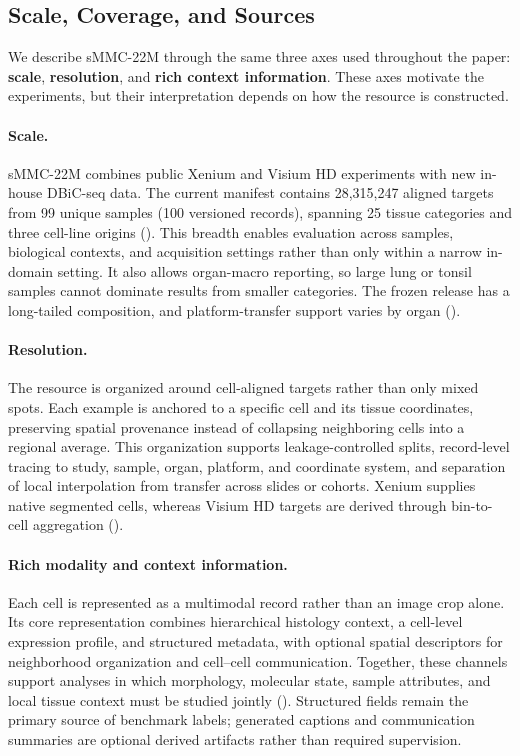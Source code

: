 \documentclass[sigconf,review]{acmart}
\newcommand{\dataset}{sMMC-22M\xspace}
\begin{document}
\subsection{Scale, Coverage, and Sources}
We describe \dataset through the same three axes used throughout the paper:
\textbf{scale}, \textbf{resolution}, and \textbf{rich context information}.
These axes motivate the experiments, but their interpretation depends on how
the resource is constructed.

\paragraph{Scale.}
\dataset combines public Xenium and Visium HD experiments with new in-house
DBiC-seq data. The current manifest contains 28{,}315{,}247 aligned targets
from 99 unique samples (100 versioned records), spanning 25 tissue categories
and three cell-line origins (). This breadth
enables evaluation across samples, biological contexts, and acquisition
settings rather than only within a narrow in-domain setting. It also allows
organ-macro reporting, so large lung or tonsil samples cannot dominate results
from smaller categories. The frozen release has a long-tailed composition, and
platform-transfer support varies by organ
().

\paragraph{Resolution.}
The resource is organized around cell-aligned targets rather than only mixed
spots. Each example is anchored to a specific cell and its tissue coordinates,
preserving spatial provenance instead of collapsing neighboring cells into a
regional average. This organization supports leakage-controlled splits,
record-level tracing to study, sample, organ, platform, and coordinate system,
and separation of local interpolation from transfer across slides or cohorts.
Xenium supplies native segmented cells, whereas Visium HD targets are derived
through bin-to-cell aggregation ().

\paragraph{Rich modality and context information.}
Each cell is represented as a multimodal record rather than an image crop
alone. Its core representation combines hierarchical histology context, a
cell-level expression profile, and structured metadata, with optional spatial
descriptors for neighborhood organization and cell--cell communication.
Together, these channels support analyses in which morphology, molecular
state, sample attributes, and local tissue context must be studied jointly
(). Structured fields remain the primary source of
benchmark labels; generated captions and communication summaries are optional
derived artifacts rather than required supervision.
\end{document}
